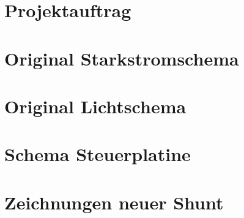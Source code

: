 \chapter{Projektauftrag}

%

%

\chapter{Original Starkstromschema}\label{schema_original}


\chapter{Original Lichtschema}\label{app:licht}


\chapter{Schema Steuerplatine}\label{Anh_Steuerplatine}



\chapter{Zeichnungen neuer Shunt}\label{app:2d}


